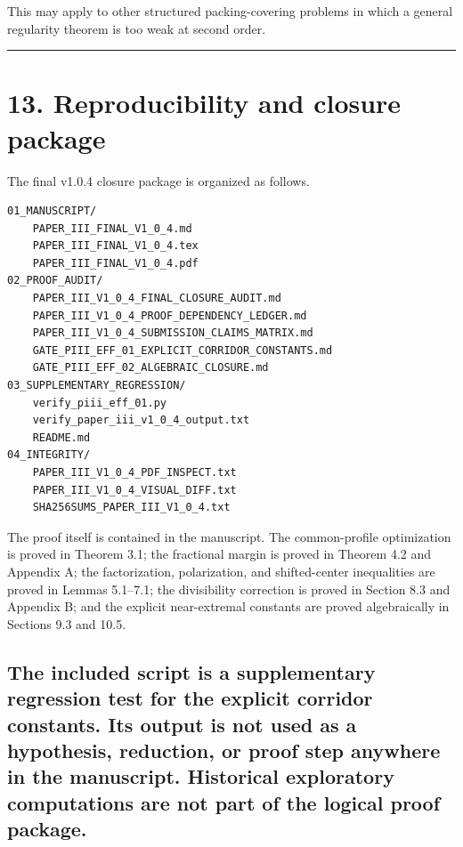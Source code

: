 \documentclass[11pt,a4paper]{article}
\begin{document}
This may apply to other structured packing-covering problems in which a general regularity theorem is too weak at second order.

\begin{center}\rule{0.5\linewidth}{0.5pt}\end{center}

\section{13. Reproducibility and closure package}\label{reproducibility-and-closure-package}

The final v1.0.4 closure package is organized as follows.

\begin{verbatim}
01_MANUSCRIPT/
    PAPER_III_FINAL_V1_0_4.md
    PAPER_III_FINAL_V1_0_4.tex
    PAPER_III_FINAL_V1_0_4.pdf
02_PROOF_AUDIT/
    PAPER_III_V1_0_4_FINAL_CLOSURE_AUDIT.md
    PAPER_III_V1_0_4_PROOF_DEPENDENCY_LEDGER.md
    PAPER_III_V1_0_4_SUBMISSION_CLAIMS_MATRIX.md
    GATE_PIII_EFF_01_EXPLICIT_CORRIDOR_CONSTANTS.md
    GATE_PIII_EFF_02_ALGEBRAIC_CLOSURE.md
03_SUPPLEMENTARY_REGRESSION/
    verify_piii_eff_01.py
    verify_paper_iii_v1_0_4_output.txt
    README.md
04_INTEGRITY/
    PAPER_III_V1_0_4_PDF_INSPECT.txt
    PAPER_III_V1_0_4_VISUAL_DIFF.txt
    SHA256SUMS_PAPER_III_V1_0_4.txt
\end{verbatim}

The proof itself is contained in the manuscript. The common-profile optimization is proved in Theorem 3.1; the fractional margin is proved in Theorem 4.2 and Appendix A; the factorization, polarization, and shifted-center inequalities are proved in Lemmas 5.1--7.1; the divisibility correction is proved in Section 8.3 and Appendix B; and the explicit near-extremal constants are proved algebraically in Sections 9.3 and 10.5.

\subsection{The included script is a supplementary regression test for the explicit corridor constants. Its output is not used as a hypothesis, reduction, or proof step anywhere in the manuscript. Historical exploratory computations are not part of the logical proof package.}\label{the-included-script-is-a-supplementary-regression-test-for-the-explicit-corridor-constants.-its-output-is-not-used-as-a-hypothesis-reduction-or-proof-step-anywhere-in-the-manuscript.-historical-exploratory-computations-are-not-part-of-the-logical-proof-package.}
\end{document}
